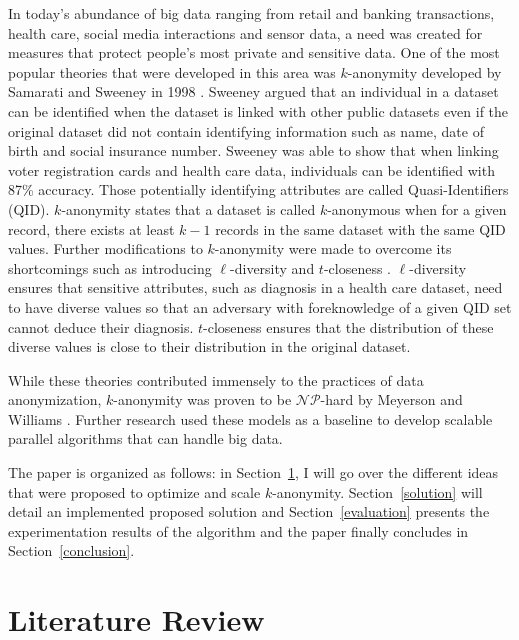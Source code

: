 \documentclass[11pt]{article}       %
\begin{document}
In today's abundance of big data ranging from retail and banking transactions, health care, social media interactions and sensor data, a need was created for measures that protect people's most private and sensitive data. One of the most popular theories that were developed in this area was $k$-anonymity developed by Samarati and Sweeney in 1998 \cite{Samarati-P.:1998}. Sweeney argued that an individual in a dataset can be identified when the dataset is linked with other public datasets even if the original dataset did not contain identifying information such as name, date of birth and social insurance number. Sweeney was able to show that when linking voter registration cards and health care data, individuals can be identified with 87\% accuracy. Those potentially identifying attributes are called Quasi-Identifiers (QID). $k$-anonymity states that a dataset is called $k$-anonymous when for a given record, there exists at least \(k-1\) records in the same dataset with the same QID values.  Further modifications to $k$-anonymity were made to overcome its shortcomings such as introducing $\ell$-diversity \cite{Machanavajjhala:2007} and $t$-closeness \cite{Li-N.:2007}. $\ell$-diversity ensures that sensitive attributes, such as diagnosis in a health care dataset, need to have diverse values so that an adversary with foreknowledge of a given QID set cannot deduce their diagnosis. $t$-closeness ensures that the distribution of these diverse values is close to their distribution in the original dataset.

While these theories contributed immensely to the practices of data anonymization, $k$-anonymity was proven to be $\mathcal{NP}$-hard by Meyerson and Williams \cite{Meyerson:2004}. Further research used these models as a baseline to develop scalable parallel algorithms that can handle big data.

The paper is organized as follows: in Section~\ref{literature}, I will go over the different ideas that were proposed to optimize and scale $k$-anonymity. Section~\ref{solution} will detail an implemented proposed solution and Section~\ref{evaluation} presents the experimentation results of the algorithm and the paper finally concludes in Section~\ref{conclusion}.


\section{Literature Review} \label{literature}
\end{document}
